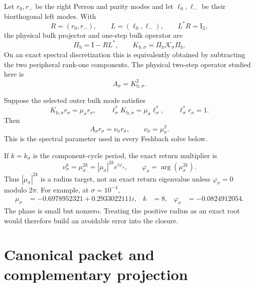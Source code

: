 \documentclass[11pt]{article}
\theoremstyle{definition}
\theoremstyle{remark}
\newcommand{\Id}{\mathrm I}
\newcommand{\cK}{\mathcal K}
\begin{document}
Let $r_0,r_-$ be the right Perron and parity modes and let
$\ell_0,\ell_-$ be their biorthogonal left modes.  With
\begin{equation}
\label{eq:peripheral-data}
 R=(r_0,r_-),
 \qquad L=(\ell_0,\ell_-),
 \qquad L^*R=\Id_2,
\end{equation}
the physical bulk projector and one-step bulk operator are
\begin{equation}
\label{eq:bulk-projector}
 \Pi_{\mathrm b}=\Id-RL^*,
 \qquad
 K_{\mathrm b,\sigma}=\Pi_{\mathrm b}\cK_\sigma\Pi_{\mathrm b}.
\end{equation}
On an exact spectral discretization this is equivalently obtained by
subtracting the two peripheral rank-one components.  The physical
two-step operator studied here is
\begin{equation}
\label{eq:A-definition}
 A_\sigma=K_{\mathrm b,\sigma}^2.
\end{equation}

Suppose the selected outer bulk mode satisfies
\begin{equation}
\label{eq:physical-eigenpair}
 K_{\mathrm b,\sigma}r_\sigma=\mu_\sigma r_\sigma,
 \qquad
 \ell_\sigma^*K_{\mathrm b,\sigma}
 =\mu_\sigma\ell_\sigma^*,
 \qquad
 \ell_\sigma^*r_\sigma=1.
\end{equation}
Then
\begin{equation}
\label{eq:two-step-target}
 A_\sigma r_\sigma=\nu_\sigma r_\sigma,
 \qquad
 \boxed{\nu_\sigma=\mu_\sigma^2}.
\end{equation}
This is the spectral parameter used in every Feshbach solve below.

If $k=k_\sigma$ is the component-cycle period, the exact return multiplier
is
\begin{equation}
\label{eq:return-target}
 \nu_\sigma^k=\mu_\sigma^{2k}
 =|\mu_\sigma|^{2k}e^{i\varphi_\sigma},
 \qquad
 \varphi_\sigma=\arg(\mu_\sigma^{2k}).
\end{equation}
Thus $|\mu_\sigma|^{2k}$ is a radius target, not an exact return
eigenvalue unless $\varphi_\sigma=0$ modulo $2\pi$.  For example, at
$\sigma=10^{-4}$,
\begin{align}
 \mu_\sigma
 &=-0.6978952321+0.2933022111i,
 &k&=8,
 &\varphi_\sigma&=-0.0824912054.
 \label{eq:complex-example}
\end{align}
The phase is small but nonzero.  Treating the positive radius as an exact
root would therefore build an avoidable error into the closure.

\section{Canonical packet and complementary projection}
\label{sec:packet}
\end{document}
